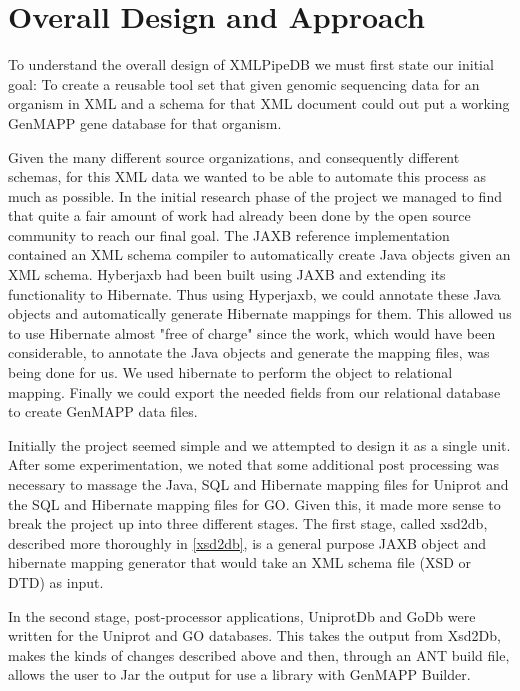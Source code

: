 \section{Overall Design and Approach}
To understand the overall design of XMLPipeDB we must first state our initial 
goal:  To create a reusable tool set that given genomic sequencing data for 
an organism in XML and a schema for that XML document could out put a working 
GenMAPP gene database for that organism.  

Given the many different source organizations, and consequently different schemas,  for this XML data we wanted to be able to automate this process as much as possible.  In the initial research phase of the project we managed to find that quite a fair amount of work had already been done by the open source community to reach our final goal.  The JAXB reference implementation contained an XML schema compiler to automatically create Java objects given an XML schema. Hyberjaxb had been built using JAXB and extending its functionality to Hibernate. Thus using Hyperjaxb, we could annotate these Java objects and automatically generate Hibernate mappings for them. This allowed us to use Hibernate almost "free of charge" since the work, which would have been considerable, to annotate the Java objects and generate the mapping files, was being done for us. We used hibernate to perform the object to relational mapping. Finally we could export the needed fields from our relational database to create GenMAPP data files. 

Initially the project seemed simple and we attempted to design it as a single unit. After some experimentation, we noted that some additional post processing was necessary to massage the Java, SQL and Hibernate mapping files for Uniprot and the SQL and Hibernate mapping files for GO. Given this, it made more sense to break the project up into three different stages.  The first stage, called xsd2db, described more thoroughly in \ref{xsd2db}, is a general purpose JAXB object and hibernate mapping generator that would take an XML schema file (XSD or DTD) as input.   


In the second stage, post-processor applications, UniprotDb and GoDb were written for the Uniprot and GO databases. This takes the output from Xsd2Db, makes the kinds of changes described above and then, through an ANT build file, allows the user to Jar the output for use a library with GenMAPP Builder.

